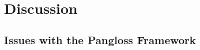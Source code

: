 \documentclass[%
 reprint,
 amsmath,amssymb,
 aps,nofootinbib
]{revtex4-1}
\begin{document}




\section{Discussion}


\subsection{Issues with the Pangloss Framework}

\end{document}

